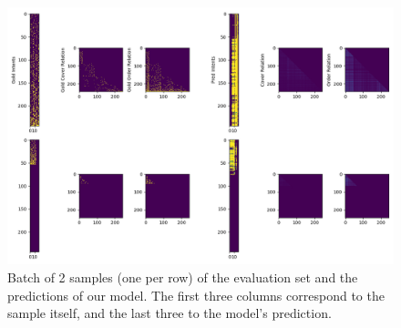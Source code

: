 \begin{figure}
    \centering
    \includegraphics[keepaspectratio, width=.9\textwidth]{Figures/Ch3/concept_small.png}
    \caption{Batch of 2 samples (one per row) of the evaluation set and the predictions of our model. The first three columns correspond to the sample itself, and the last three to the model's prediction.}
    \label{fig:fcat-perf}
\end{figure}